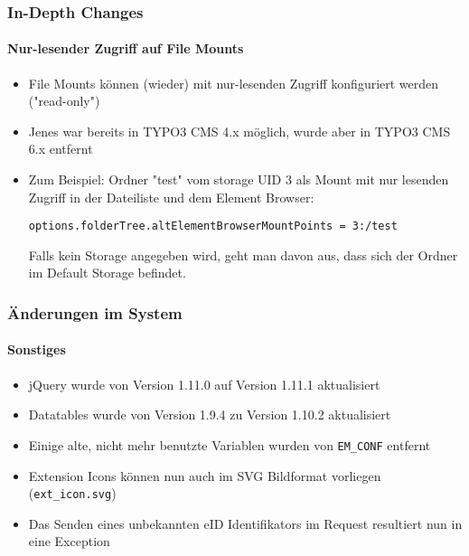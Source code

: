 
\begin{frame}[fragile]
	\frametitle{In-Depth Changes}
	\framesubtitle{Nur-lesender Zugriff auf File Mounts}

	\begin{itemize}

		\item File Mounts können (wieder) mit nur-lesenden Zugriff konfiguriert werden ("read-only")
		\item Jenes war bereits in TYPO3 CMS 4.x möglich, wurde aber in\newline
			TYPO3 CMS 6.x entfernt
		\item Zum Beispiel: Ordner "test" vom storage UID 3 als Mount mit nur lesenden Zugriff in der Dateiliste und dem Element Browser:\newline

			\smaller\texttt{options.folderTree.altElementBrowserMountPoints = 3:/test}\normalsize\newline

			Falls kein Storage angegeben wird, geht man davon aus, dass sich der Ordner im Default Storage befindet.
	\end{itemize}

\end{frame}


\begin{frame}[fragile]
	\frametitle{Änderungen im System}
	\framesubtitle{Sonstiges}

	\begin{itemize}
		\item jQuery wurde von Version 1.11.0 auf Version 1.11.1 aktualisiert
		\item Datatables wurde von Version 1.9.4 zu Version 1.10.2 aktualisiert
		\item Einige alte, nicht mehr benutzte Variablen wurden von \texttt{EM\_CONF} entfernt
		\item Extension Icons können nun auch im SVG Bildformat vorliegen (\texttt{ext\_icon.svg})
		\item Das Senden eines unbekannten eID Identifikators im Request resultiert nun in eine Exception
	\end{itemize}

\end{frame}

